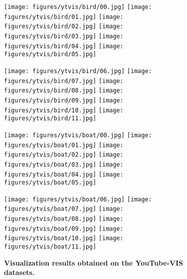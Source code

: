 \documentclass[10pt,twocolumn,letterpaper]{article}
\begin{document}
\begin{figure*}[t]
\begin{minipage}[c]{1.00\linewidth}
\texttt{[image: figures/ytvis/bird/00.jpg]}
\texttt{[image: figures/ytvis/bird/01.jpg]}
\texttt{[image: figures/ytvis/bird/02.jpg]}
\texttt{[image: figures/ytvis/bird/03.jpg]}
\texttt{[image: figures/ytvis/bird/04.jpg]}
\texttt{[image: figures/ytvis/bird/05.jpg]}
\end{minipage}\hfill
\begin{minipage}[c]{1.0\linewidth}
\texttt{[image: figures/ytvis/bird/06.jpg]}
\texttt{[image: figures/ytvis/bird/07.jpg]}
\texttt{[image: figures/ytvis/bird/08.jpg]}
\texttt{[image: figures/ytvis/bird/09.jpg]}
\texttt{[image: figures/ytvis/bird/10.jpg]}
\texttt{[image: figures/ytvis/bird/11.jpg]}
\end{minipage}\hfill\vspace{1mm}

\begin{minipage}[c]{1.00\linewidth}
\texttt{[image: figures/ytvis/boat/00.jpg]}
\texttt{[image: figures/ytvis/boat/01.jpg]}
\texttt{[image: figures/ytvis/boat/02.jpg]}
\texttt{[image: figures/ytvis/boat/03.jpg]}
\texttt{[image: figures/ytvis/boat/04.jpg]}
\texttt{[image: figures/ytvis/boat/05.jpg]}
\end{minipage}\hfill
\begin{minipage}[c]{1.0\linewidth}
\texttt{[image: figures/ytvis/boat/06.jpg]}
\texttt{[image: figures/ytvis/boat/07.jpg]}
\texttt{[image: figures/ytvis/boat/08.jpg]}
\texttt{[image: figures/ytvis/boat/09.jpg]}
\texttt{[image: figures/ytvis/boat/10.jpg]}
\texttt{[image: figures/ytvis/boat/11.jpg]}
\end{minipage}\hfill\vspace{1mm}

\caption{\textbf{Visualization results obtained on the YouTube-VIS datasets.}}
\label{fig:ytvis demo}
\end{figure*}
\end{document}
